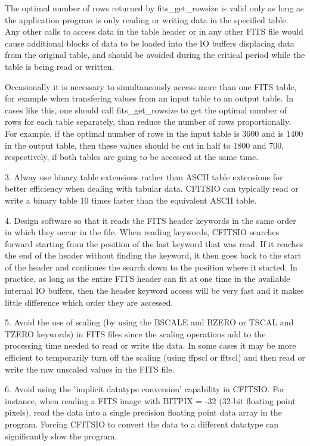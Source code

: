 The optimal number of rows returned by fits\_get\_rowsize is valid only
as long as the application program is only reading or writing data in
the specified table.  Any other calls to access data in the table
header or in any other FITS file would  cause additional blocks of data
to be loaded into the IO buffers displacing data from the original
table, and should be avoided during the critical period while the table
is being read or written.

Occasionally it is necessary to simultaneously access more than one
FITS table, for example when transfering values from an input table to
an output table.  In cases like this, one should call
fits\_get\_rowsize to get the optimal number of rows for each table
separately, than reduce the number of rows proportionally.  For
example, if the optimal number of rows in the input table is 3600 and
is 1400 in the output table, then these values should be cut in half to
1800 and 700, respectively, if both tables are going to be accessed at
the same time.

3.  Alway use binary table extensions rather than ASCII table
extensions for better efficiency  when dealing with tabular data.
CFITSIO can typically read or write a binary table 10 times faster than
the equivalent ASCII table.

4. Design software so that it reads the FITS header keywords in the
same order in which they occur in the file.  When reading keywords,
CFITSIO searches forward starting from the position of the last keyword
that was read.  If it reaches the end of the header without finding the
keyword, it then goes back to the start of the header and continues the
search down to the position where it started.  In practice, as long as
the entire FITS header can fit at one time in the available internal IO
buffers, then the header keyword access will be very fast and it makes
little difference which order they are accessed.

5. Avoid the use of scaling (by using the BSCALE and BZERO or TSCAL and
TZERO keywords) in FITS files since the scaling operations add to the
processing time needed to read or write the data.  In some cases it may
be more efficient to temporarily turn off the scaling (using ffpscl or
fftscl) and then read or write the raw unscaled values in the FITS
file.

6. Avoid using the 'implicit datatype conversion' capability in
CFITSIO.  For instance, when reading a FITS image with BITPIX = -32
(32-bit floating point pixels), read the data into a single precision
floating point data array in the program.  Forcing CFITSIO to convert
the data to a different datatype can significantly slow the program.

